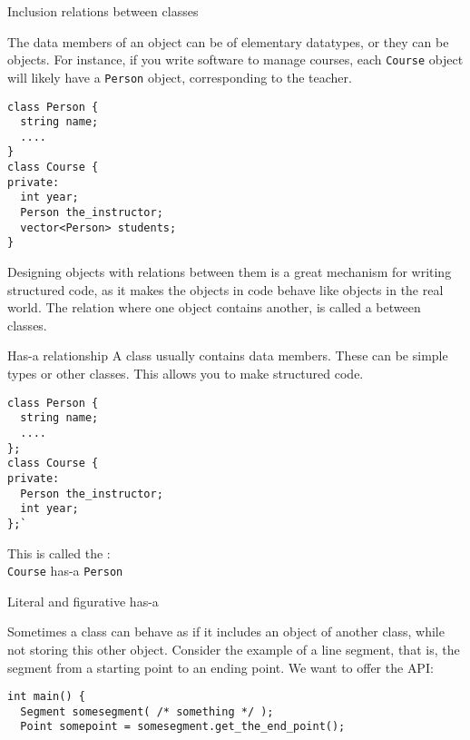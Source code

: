 
 {Inclusion relations between classes}
\label{sec:hasa}

The data members of an object can be of elementary datatypes, or they
can be objects. For instance, if you write software to manage courses,
each \lstinline{Course} object will likely have a \lstinline{Person} object,
corresponding to the teacher.

\begin{lstlisting}
class Person {
  string name;
  ....
}
class Course {
private:
  int year;
  Person the_instructor;
  vector<Person> students;
}
\end{lstlisting}

Designing objects with relations between them
is a great mechanism for writing structured code,
as it makes the objects in code behave like objects in the real world.
The relation where one object contains another, is called a
 between classes.

\begin{slide}{Has-a relationship}
  \label{sl:obj-hasa}
  A class usually contains data members. These can be simple types or
  other classes. This allows you to make structured code.
\begin{lstlisting}
class Person {
  string name;
  ....
};
class Course {
private:
  Person the_instructor;
  int year;
};`
\end{lstlisting}
This is called the :\\
\lstinline{Course} has-a \lstinline{Person}
\end{slide}

 {Literal and figurative has-a}

Sometimes a class can behave as if it includes an object of another
class, while not storing this other object.
Consider the example of a line segment, that is, the segment
from a starting point to an ending point.
We want to offer the \ac{API}:
\begin{lstlisting}
int main() {
  Segment somesegment( /* something */ );
  Point somepoint = somesegment.get_the_end_point();
\end{lstlisting}

